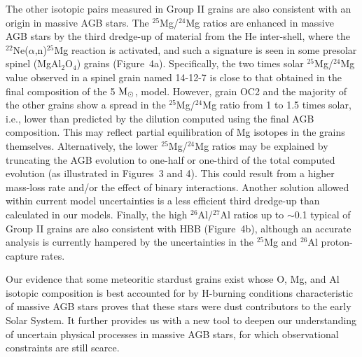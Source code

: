 \documentclass{nature}
\newcommand{\iso}[2]{\hbox{${}^{#1}${#2}}}
\newcommand{\msun}{\ensuremath{{\rm M}_{\odot}}}
\begin{document}
The other isotopic pairs measured in Group II grains are also
consistent with an origin in massive AGB stars. The \iso{25}Mg/\iso{24}Mg ratios 
are enhanced in massive AGB stars by the third dredge-up of material from the He inter-shell, 
where the \iso{22}Ne($\alpha$,n)\iso{25}Mg reaction is 
activated, and such a signature is seen in some presolar spinel (MgAl$_{2}$O$_{4}$) grains 
(Figure~4a). 
Specifically, the two times solar \iso{25}Mg/\iso{24}Mg value observed in a spinel grain named 
14-12-7\cite{gyngard10} is 
close to that obtained in the final composition of the 5 \msun, model. 
However, grain OC2\cite{lugaro07} and the majority of the other grains show a spread in 
the \iso{25}Mg/\iso{24}Mg ratio from 1 to 1.5 times solar, i.e., 
lower than predicted by the dilution computed using  
the final AGB composition. This may reflect partial equilibration of Mg isotopes in 
the grains themselves\cite{nittler08}. 
Alternatively, the lower \iso{25}Mg/\iso{24}Mg ratios may be 
explained by truncating 
the AGB evolution to one-half or one-third of the total computed evolution 
(as illustrated in Figures~3 and 4). This could result from a higher mass-loss rate and/or the effect of binary 
interactions. Another solution allowed within current model uncertainties is 
a less efficient third dredge-up than calculated in our models.
Finally, the high \iso{26}Al/\iso{27}Al ratios up to $\sim$0.1 typical of 
Group II grains are also consistent with HBB (Figure~4b),
although an accurate analysis is currently hampered by the uncertainties in the 
\iso{25}Mg and \iso{26}Al proton-capture rates\cite{iliadis10,straniero13}. 

Our evidence that some meteoritic stardust grains exist whose O, Mg, and Al 
isotopic composition is best accounted for by H-burning conditions characteristic of massive 
AGB stars proves that these stars were dust contributors to the early Solar System. It 
further provides us with a new tool to deepen our understanding of uncertain physical 
processes in massive AGB stars, for which observational constraints are still scarce.

%
\end{document}
